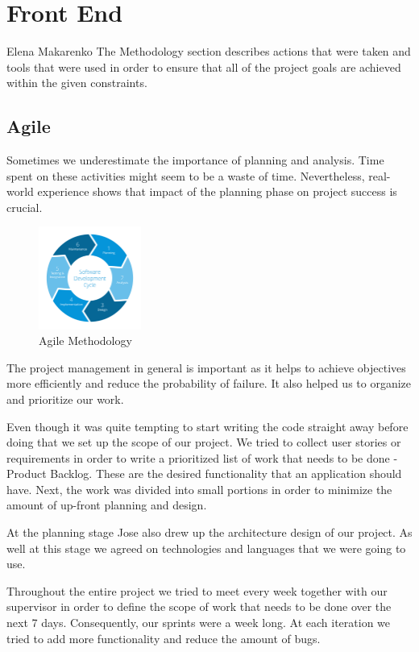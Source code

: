 \section{Front End}
Elena Makarenko
\vskip 0.1in
\indent
\indent
The Methodology section describes actions that were taken and tools that were used in order to ensure that all of the project goals are achieved within the given constraints.

\subsection{Agile} 
\indent
\indent
Sometimes we underestimate the importance of planning and analysis.
Time spent on these activities might seem to be a waste of time.
Nevertheless, real-world experience shows that impact of the planning phase on project success is crucial.

\begin{figure}[ht]
    \centering
    \includegraphics[width=0.3\textwidth]{img/agile.png}
     \caption{Agile Methodology}
    \label{fig:Agile}
\end{figure}

The project management in general is important as it helps to achieve objectives more efficiently and reduce the probability of failure.  It also helped us to organize and prioritize our work.

Even though it was quite tempting to start writing the code straight away before doing that we set up the scope of our project.
We tried to collect user stories or requirements in order to write a prioritized list of work that needs to be done -  Product Backlog. These are the desired functionality that an application should have. Next, the work was divided into small portions in order to minimize the amount of up-front planning and design. 

At the planning stage Jose also drew up the architecture design of our project.
As well at this stage we agreed on technologies and languages that we were going to use. 

Throughout the entire project we tried to meet every week together with our supervisor in order to define the scope of work that needs to be done over the next 7 days. Consequently, our sprints were a week long. At each iteration we tried to add more functionality and reduce the amount of bugs.
 
